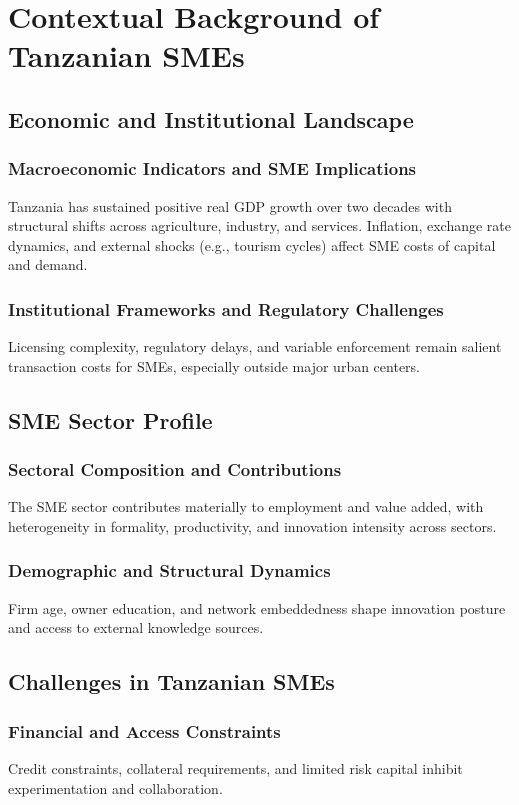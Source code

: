 \chapter{Contextual Background of Tanzanian SMEs}\label{ch:context}

\section{Economic and Institutional Landscape}
\subsection{Macroeconomic Indicators and SME Implications}
Tanzania has sustained positive real GDP growth over two decades with structural shifts across agriculture, industry, and services. Inflation, exchange rate dynamics, and external shocks (e.g., tourism cycles) affect SME costs of capital and demand.

\subsection{Institutional Frameworks and Regulatory Challenges}
Licensing complexity, regulatory delays, and variable enforcement remain salient transaction costs for SMEs, especially outside major urban centers.

\section{SME Sector Profile}
\subsection{Sectoral Composition and Contributions}
The SME sector contributes materially to employment and value added, with heterogeneity in formality, productivity, and innovation intensity across sectors.

\subsection{Demographic and Structural Dynamics}
Firm age, owner education, and network embeddedness shape innovation posture and access to external knowledge sources.

\section{Challenges in Tanzanian SMEs}
\subsection{Financial and Access Constraints}
Credit constraints, collateral requirements, and limited risk capital inhibit experimentation and collaboration.

